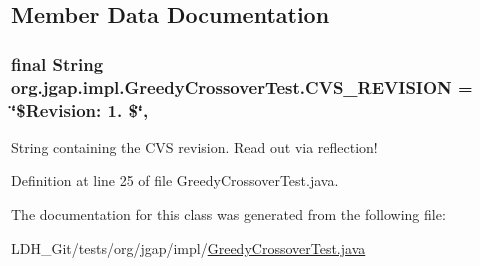 \subsection{Member Data Documentation}
\hypertarget{classorg_1_1jgap_1_1impl_1_1_greedy_crossover_test_ac533e58c4cc8873ee3d40f2d56f9435f}{
\subsubsection[{C\-V\-S\-\_\-\-R\-E\-V\-I\-S\-I\-O\-N}]{\setlength{\rightskip}{0pt plus 5cm}final String org.\-jgap.\-impl.\-Greedy\-Crossover\-Test.\-C\-V\-S\-\_\-\-R\-E\-V\-I\-S\-I\-O\-N = \char`\"{}\$Revision\-: 1. \$\char`\"{}\hspace{0.3cm}{\ttfamily [static]}, {\ttfamily [private]}}}\label{classorg_1_1jgap_1_1impl_1_1_greedy_crossover_test_ac533e58c4cc8873ee3d40f2d56f9435f}
String containing the C\-V\-S revision. Read out via reflection! 

Definition at line 25 of file Greedy\-Crossover\-Test.\-java.



The documentation for this class was generated from the following file\-:\begin{DoxyCompactItemize}
\item 
L\-D\-H\-\_\-\-Git/tests/org/jgap/impl/\hyperlink{_greedy_crossover_test_8java}{Greedy\-Crossover\-Test.\-java}\end{DoxyCompactItemize}
